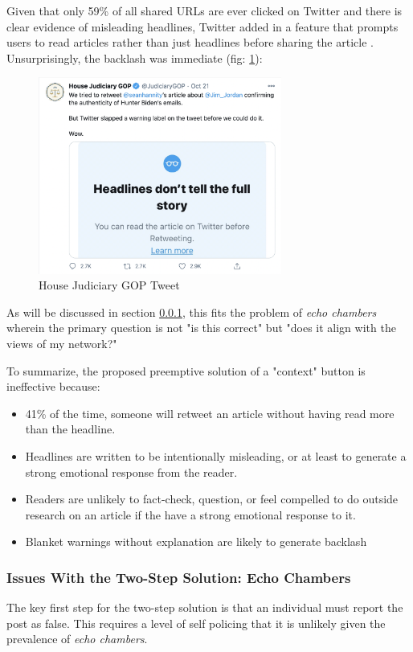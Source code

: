 \documentclass[preprint,review,12pt]{elsarticle}
\begin{document}
 
Given that only 59\% of all shared URLs are ever clicked on Twitter \cite{gabielkov2016social} and there is clear evidence of misleading headlines, Twitter added in a feature that prompts users to read articles rather than just headlines before sharing the article \cite{reuters2020article}. Unsurprisingly, the backlash was immediate (fig: \ref{fig:House Judiciary GOP Tweet}):
 \begin{figure}[htp]
    \centering
    \includegraphics[width=8cm]{JudiciaryTweet.png}
    \caption{House Judiciary GOP Tweet}
    \label{fig:House Judiciary GOP Tweet}
\end{figure}

As will be discussed in section \ref{sec: echo chambers}, this fits the problem of \textit{echo chambers} wherein the primary question is not "is this correct" but "does it align with the views of my network?" 

To summarize, the proposed preemptive solution of a "context" button is ineffective because:
\begin{itemize}
\item 41\% of the time, someone will retweet an article without having read more than the headline. \cite{gabielkov2016social}
\item Headlines are written to be intentionally misleading, or at least to generate a strong emotional response from the reader.\cite{chesney2017incongruent}
\item Readers are unlikely to fact-check, question, or feel compelled to do outside research on an article if the have a strong emotional response to it.\cite{nyhan2010corrections}
\item Blanket warnings without explanation are likely to generate backlash \cite{reuters2020article}
 
 \end{itemize}

\subsubsection{Issues With the Two-Step Solution: Echo Chambers}
\label{sec: echo chambers}
 The key first step for the two-step solution is that an individual must report the post as false. This requires a level of self policing that it is unlikely given the prevalence of \textit{echo chambers}. 
 
\end{document}
